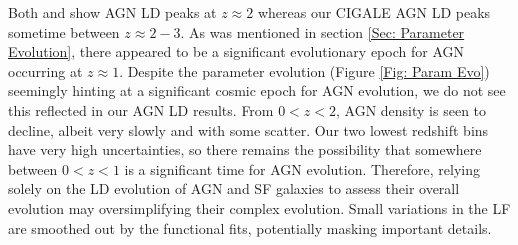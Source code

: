 Both \cite{symeonidis_agn_2021} and \cite{delvecchio_tracing_2014} show AGN LD peaks at $z\approx2$ whereas our CIGALE AGN LD peaks sometime between $z\approx2-3$. As was mentioned in section \ref{Sec: Parameter Evolution}, there appeared to be a significant evolutionary epoch for AGN occurring at $z\approx1$. Despite the parameter evolution (Figure \ref{Fig: Param Evo}) seemingly hinting at a significant cosmic epoch for AGN evolution, we do not see this reflected in our AGN LD results. From $0<z<2$, AGN density is seen to decline, albeit very slowly and with some scatter. Our two lowest redshift bins have very high uncertainties, so there remains the possibility that somewhere between $0<z<1$ is a significant time for AGN evolution. Therefore, relying solely on the LD evolution of AGN and SF galaxies to assess their overall evolution may oversimplifying their complex evolution. Small variations in the LF are smoothed out by the functional fits, potentially masking important details. 





